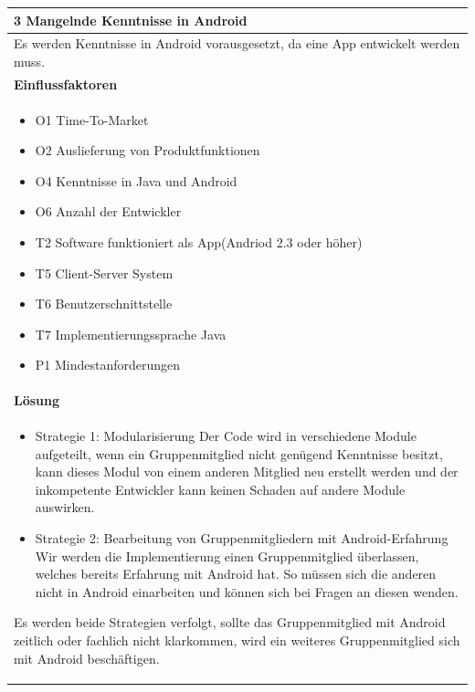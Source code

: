 \documentclass[fontsize=12pt,paper=a4,twoside]{scrartcl}
\begin{document}
\begin{table}[H]
\begin{tabular}{|p{\textwidth}|}\hline
3 Mangelnde Kenntnisse in Android\\ \hline
Es werden Kenntnisse in Android vorausgesetzt, da eine App entwickelt werden muss. \\ \hline
\textbf{Einflussfaktoren}\\
\begin{itemize}
\item O1 Time-To-Market
\item O2 Auslieferung von Produktfunktionen
\item O4 Kenntnisse in Java und Android
\item O6 Anzahl der Entwickler
\item T2 Software funktioniert als App(Andriod 2.3 oder höher)
\item T5 Client-Server System
\item T6 Benutzerschnittstelle
\item T7 Implementierungssprache Java
\item P1 Mindestanforderungen
\end{itemize}\\ \hline
\textbf{Lösung}\\
\begin{itemize}
\item Strategie 1: Modularisierung \leavevmode\newline
Der Code wird in verschiedene Module aufgeteilt, wenn ein Gruppenmitglied nicht genügend Kenntnisse besitzt, kann dieses Modul von einem anderen Mitglied neu erstellt werden und der inkompetente Entwickler kann keinen Schaden auf andere Module auswirken.
\item Strategie 2: Bearbeitung von Gruppenmitgliedern mit Android-Erfahrung \leavevmode\newline
Wir werden die Implementierung einen Gruppenmitglied überlassen, welches bereits Erfahrung mit Android hat. So müssen sich die anderen nicht in Android einarbeiten und können sich bei Fragen an diesen wenden.
\end{itemize}
Es werden beide Strategien verfolgt, sollte das Gruppenmitglied mit Android zeitlich oder fachlich nicht klarkommen, wird ein weiteres Gruppenmitglied sich mit Android beschäftigen.\\ \hline
\end{tabular}
\end{table}
\end{document}
